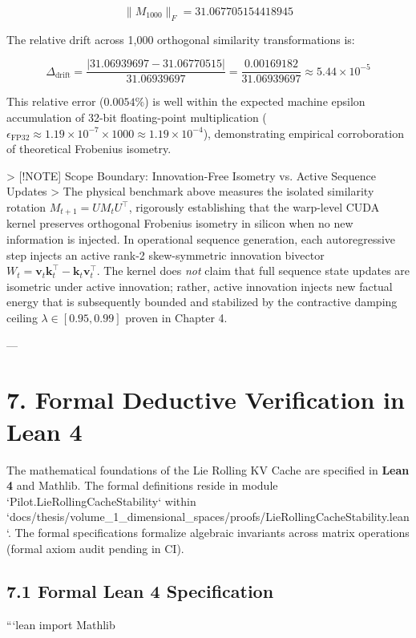\documentclass[11pt,twoside,openright]{amsbook}
\begin{document}
{{{{{{{   $$\|M_{1000}\|_F = 31.067705154418945$$
   
   The relative drift across 1,000 orthogonal similarity transformations is:
   
   $$\Delta_{\text{drift}} = \frac{|31.06939697 - 31.06770515|}{31.06939697} = \frac{0.00169182}{31.06939697} \approx 5.44 \times 10^{-5}$$
   
   This relative error ($0.0054\%$) is well within the expected machine epsilon accumulation of 32-bit floating-point multiplication ($\epsilon_{\text{FP32}} \approx 1.19 \times 10^{-7} \times 1000 \approx 1.19 \times 10^{-4}$), demonstrating empirical corroboration of theoretical Frobenius isometry.

> [!NOTE] Scope Boundary: Innovation-Free Isometry vs. Active Sequence Updates
> The physical benchmark above measures the isolated similarity rotation $M_{t+1} = U M_t U^\top$, rigorously establishing that the warp-level CUDA kernel preserves orthogonal Frobenius isometry in silicon when no new information is injected. In operational sequence generation, each autoregressive step injects an active rank-2 skew-symmetric innovation bivector $W_t = \mathbf{v}_t \mathbf{k}_t^\top - \mathbf{k}_t \mathbf{v}_t^\top$. The kernel does \textit{not} claim that full sequence state updates are isometric under active innovation; rather, active innovation injects new factual energy that is subsequently bounded and stabilized by the contractive damping ceiling $\lambda \in [0.95, 0.99]$ proven in Chapter 4.

---

\section{7. Formal Deductive Verification in Lean 4}

The mathematical foundations of the Lie Rolling KV Cache are specified in \textbf{Lean 4} and Mathlib. The formal definitions reside in module `Pilot.LieRollingCacheStability` within `docs/thesis/volume_1_dimensional_spaces/proofs/LieRollingCacheStability.lean`. The formal specifications formalize algebraic invariants across matrix operations (formal axiom audit pending in CI).

\subsection{7.1 Formal Lean 4 Specification}

```lean
import Mathlib

}}}}}}}
\end{document}
